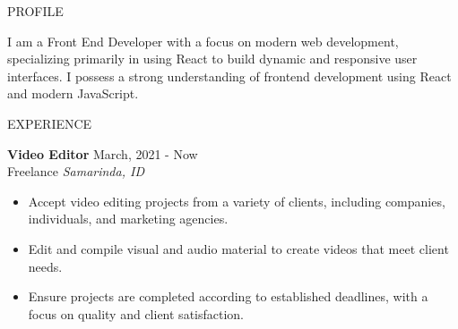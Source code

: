 \documentclass{resume} %
\begin{document}

\begin{rSection}{PROFILE}

{I am a Front End Developer with a focus on modern web development, specializing primarily in using React to build dynamic and responsive user interfaces. I possess a strong understanding of frontend development using React and modern JavaScript.}


\end{rSection}


\begin{rSection}{EXPERIENCE}

\textbf{Video Editor} \hfill March, 2021 - Now\\
Freelance \hfill \textit{Samarinda, ID}
 \begin{itemize}
    \itemsep -3pt {} 
     \item Accept video editing projects from a variety of clients, including companies, individuals, and marketing agencies.
     \item Edit and compile visual and audio material to create videos that meet client needs.
    \item Ensure projects are completed according to established deadlines, with a focus on quality and client satisfaction. 
 \end{itemize}

\end{rSection} 

\end{document}
